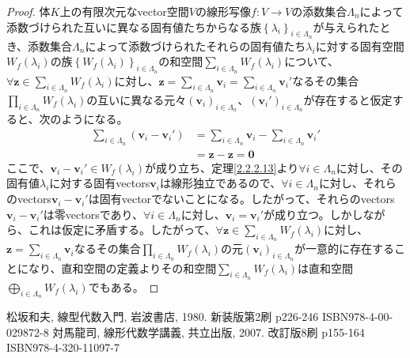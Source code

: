 \documentclass[dvipdfmx]{jsarticle}
\begin{document}
\begin{proof}
体$K$上の有限次元なvector空間$V$の線形写像$f:V \rightarrow V$の添数集合$\varLambda_{n}$によって添数づけられた互いに異なる固有値たちからなる族$\left\{ \lambda_{i} \right\}_{i \in \varLambda_{n}}$が与えられたとき、添数集合$\varLambda_{n}$によって添数づけられたそれらの固有値たち$\lambda_{i}$に対する固有空間$W_{f}\left( \lambda_{i} \right)$の族$\left\{ W_{f}\left( \lambda_{i} \right) \right\}_{i \in \varLambda_{n}}$の和空間$\sum_{i \in \varLambda_{n}} {W_{f}\left( \lambda_{i} \right)}$について、$\forall\mathbf{z} \in \sum_{i \in \varLambda_{n}} {W_{f}\left( \lambda_{i} \right)}$に対し、$\mathbf{z} = \sum_{i \in \varLambda_{n}} \mathbf{v}_{i} = \sum_{i \in \varLambda_{n}} \mathbf{v}_{i}'$なるその集合$\prod_{i \in \varLambda_{n}} {W_{f}\left( \lambda_{i} \right)}$の互いに異なる元々$\left( \mathbf{v}_{i} \right)_{i \in \varLambda_{n}}$、$\left( \mathbf{v}_{i}' \right)_{i \in \varLambda_{n}}$が存在すると仮定すると、次のようになる。
\begin{align*}
\sum_{i \in \varLambda_{n}} \left( \mathbf{v}_{i} - \mathbf{v}_{i}' \right) &= \sum_{i \in \varLambda_{n}} \mathbf{v}_{i} - \sum_{i \in \varLambda_{n}} \mathbf{v}_{i}'\\
&= \mathbf{z} - \mathbf{z} = \mathbf{0}
\end{align*}
ここで、$\mathbf{v}_{i} - \mathbf{v}_{i}' \in W_{f}\left( \lambda_{i} \right)$が成り立ち、定理\ref{2.2.2.13}より$\forall i \in \varLambda_{n}$に対し、その固有値$\lambda_{i}$に対する固有vectors$\mathbf{v}_{i}$は線形独立であるので、$\forall i \in \varLambda_{n}$に対し、それらのvectors$\mathbf{v}_{i} - \mathbf{v}_{i}'$は固有vectorでないことになる。したがって、それらのvectors$\mathbf{v}_{i} - \mathbf{v}_{i}'$は零vectorsであり、$\forall i \in \varLambda_{n}$に対し、$\mathbf{v}_{i} = \mathbf{v}_{i}'$が成り立つ。しかしながら、これは仮定に矛盾する。したがって、$\forall\mathbf{z} \in \sum_{i \in \varLambda_{n}} {W_{f}\left( \lambda_{i} \right)}$に対し、$\mathbf{z} = \sum_{i \in \varLambda_{n}} \mathbf{v}_{i}$なるその集合$\prod_{i \in \varLambda_{n}} {W_{f}\left( \lambda_{i} \right)}$の元$\left( \mathbf{v}_{i} \right)_{i \in \varLambda_{n}}$が一意的に存在することになり、直和空間の定義よりその和空間$\sum_{i \in \varLambda_{n}} {W_{f}\left( \lambda_{i} \right)}$は直和空間$\bigoplus_{i \in \varLambda_{n}} {W_{f}\left( \lambda_{i} \right)}$でもある。
\end{proof}
\begin{thebibliography}{50}
    松坂和夫, 線型代数入門, 岩波書店, 1980. 新装版第2刷 p226-246 ISBN978-4-00-029872-8
    対馬龍司, 線形代数学講義, 共立出版, 2007. 改訂版8刷 p155-164 ISBN978-4-320-11097-7
\end{thebibliography}
\end{document}
